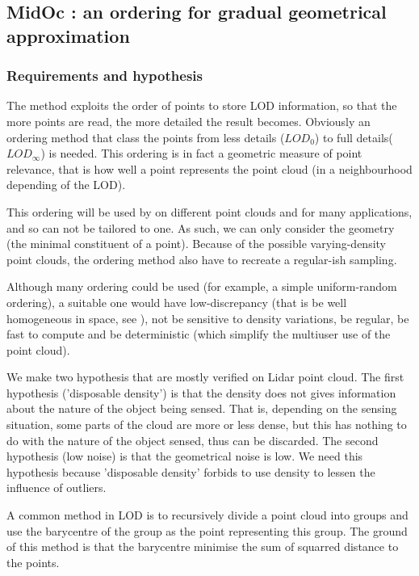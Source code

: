 	
	\subsection{MidOc : an ordering for gradual geometrical approximation}
		\label{lod.method:midoc}
		\subsubsection{Requirements and hypothesis}
		\label{lod.method.midoc.hypothesis}
		The method exploits the order of points to store LOD information, so that the more points are read, the more detailed the result becomes.
		Obviously an ordering method that class the points from less details ($LOD_0$) to full details($LOD_\infty$) is needed.
		This ordering is in fact a geometric measure of point relevance, that is how well a point represents the point cloud (in a neighbourhood depending of the LOD).
		
		This ordering will be used by on different point clouds and for many applications, and so can not be tailored to one.
		As such, we can only consider the geometry (the minimal constituent of a point).
		Because of the possible varying-density point clouds, the ordering method also have to recreate a regular-ish sampling.
		
		Although many ordering could be used (for example, a simple uniform-random ordering),
		a suitable one would have low-discrepancy (that is be well homogeneous in space, see \cite{Rainville2012}), not be sensitive to density variations, be regular, be fast to compute and be deterministic (which simplify the multiuser use of the point cloud).
		
		We make two hypothesis that are mostly verified on Lidar point cloud.
		The first hypothesis ('disposable density') is that the density does not gives information about the nature of the object being sensed. 
		That is, depending on the sensing situation, some parts of the cloud are more or less dense, but this has nothing to do with the nature of the object sensed, thus can be discarded.
		The second hypothesis (low noise) is that the geometrical noise is low.
		We need this hypothesis because 'disposable density' forbids to use density to lessen the influence of outliers.
		
		A common method in LOD is to recursively divide a point cloud into groups and use the barycentre of the group as the point representing this group. The ground of this method is that the barycentre minimise the sum of squarred distance to the points.
		

